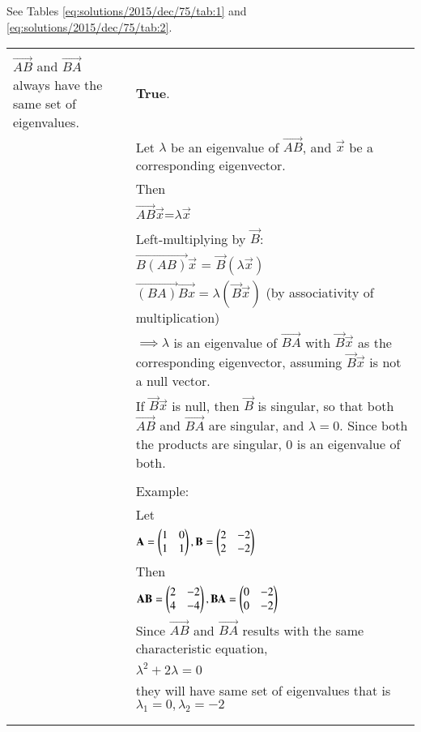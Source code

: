 See Tables 
\ref{eq:solutions/2015/dec/75/tab:1} and 
\ref{eq:solutions/2015/dec/75/tab:2}. 

\begin{table*}[h]
	\begin{tabular}{|m{3cm}|m{14cm}|}
		\hline
		&\\
		$\vec{AB}$ and $\vec{BA}$ always have the same set of eigenvalues.
		& \textbf{True}. \\
		& Let  $\lambda$  be an eigenvalue of  $\vec{AB}$, and $\vec{x}$  be a corresponding eigenvector.\\
		&Then \\
		& \qquad\qquad\qquad$\vec{AB} \vec{x}$=$\lambda \vec{x}$ \\
		& Left-multiplying by $\vec{B}$:\\
		&\qquad\qquad\qquad$\vec{B(AB)}\vec{x}$ = $\vec{B}(\lambda \vec{x})$\\
		& \qquad\qquad\qquad$\vec{(BA)}\vec{Bx}=\lambda(\vec{B}\vec{x})$  (by associativity of multiplication)\\
	    & $\implies  \lambda $ is an eigenvalue of  $\vec{BA}$  with  $\vec{B}\vec{x}$  as the corresponding eigenvector, assuming  $\vec{B}\vec{x}$  is not a null vector.\\
		&If  $\vec{B}\vec{x}$   is null, then  $\vec{B}$   is singular, so that both  $\vec{AB}$ and  $\vec{BA}$ are singular, and  $\lambda=0$. Since both the products are singular,  0  is an eigenvalue of both.\\
		&\\
		& Example:\\
		& Let \\
		&\qquad\qquad\qquad$\mathbf{A} = \begin{pmatrix}1 & 0 \\ 1 & 1\end{pmatrix}, \mathbf{B} = \begin{pmatrix}2 & -2 \\ 2 & -2\end{pmatrix}$\\
		&Then\\
		& \qquad\qquad\qquad$\mathbf{AB} = \begin{pmatrix}2 & -2 \\ 4 & -4\end{pmatrix}, \mathbf{BA} = \begin{pmatrix}0 & -2 \\ 0 & -2\end{pmatrix}$\\
		& Since $\vec{AB}$ and $\vec{BA}$ results with the same characteristic equation,\\
		& \qquad\qquad\qquad $\lambda^2 + 2\lambda = 0$\\
		&they will have same set of eigenvalues that is $\lambda_1 = 0, \lambda_2 = -2$\\
		& \\
		\hline
		&\\

\end{tabular}
\end{table*}
